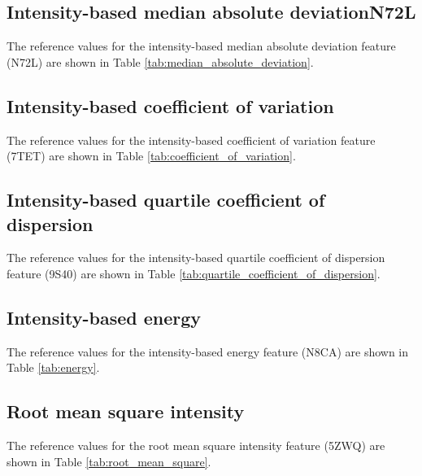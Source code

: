 \documentclass[fleqn,a4paper,oneside,openany]{book}
\newcommand\id[1]{{\hfill\normalsize{\idfont #1}}}
\newcommand\textid[1]{{\normalsize{\idfont #1}}}
\begin{document}
\subsection{Intensity-based median absolute deviation\id{N72L}}
The reference values for the intensity-based median absolute deviation feature (\textid{N72L}) are shown in Table \ref{tab:median_absolute_deviation}.

\begin{minipage}[l]{0.45\textwidth}

\end{minipage}
\quad
\begin{minipage}[r]{0.45\textwidth}

\end{minipage}
\FloatBarrier

\subsection{Intensity-based coefficient of variation}
The reference values for the intensity-based coefficient of variation feature (\textid{7TET}) are shown in Table \ref{tab:coefficient_of_variation}.

\subsection{Intensity-based quartile coefficient of dispersion}
The reference values for the intensity-based quartile coefficient of dispersion feature (\textid{9S40}) are shown in Table \ref{tab:quartile_coefficient_of_dispersion}.

\begin{minipage}[l]{0.45\textwidth}

\end{minipage}
\quad
\begin{minipage}[r]{0.45\textwidth}

\end{minipage}
\FloatBarrier

\subsection{Intensity-based energy}
The reference values for the intensity-based energy feature (\textid{N8CA}) are shown in Table \ref{tab:energy}.

\subsection{Root mean square intensity}
The reference values for the root mean square intensity feature (\textid{5ZWQ}) are shown in Table \ref{tab:root_mean_square}.
\end{document}

